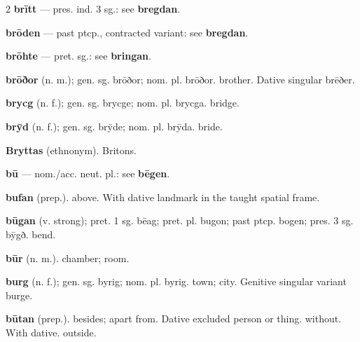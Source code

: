 \begin{multicols*}{2}
\textbf{brītt} — pres. ind. 3 sg.: see \textbf{bregdan}.\par
\textbf{brōden} — past ptcp., contracted variant: see \textbf{bregdan}.\par
\textbf{brōhte} — pret. sg.: see \textbf{bringan}.\par
\textbf{brōðor} (n. m.); gen. sg. brōðor; nom. pl. brōðor. brother. Dative singular brēðer.\par
\textbf{brycg} (n. f.); gen. sg. brycge; nom. pl. brycga. bridge.\par
\textbf{brȳd} (n. f.); gen. sg. brȳde; nom. pl. brȳda. bride.\par
\textbf{Bryttas} (ethnonym). Britons.\par
\textbf{bū} — nom./acc. neut. pl.: see \textbf{bēgen}.\par
\textbf{bufan} (prep.). above. With dative landmark in the taught spatial frame.\par
\textbf{būgan} (v. strong); pret. 1 sg. bēag; pret. pl. bugon; past ptcp. bogen; pres. 3 sg. bȳgð. bend.\par
\textbf{būr} (n. m.). chamber; room.\par
\textbf{burg} (n. f.); gen. sg. byrig; nom. pl. byrig. town; city. Genitive singular variant burge.\par
\textbf{būtan} (prep.). besides; apart from. Dative excluded person or thing. without. With dative. outside.\par

\end{multicols*}
